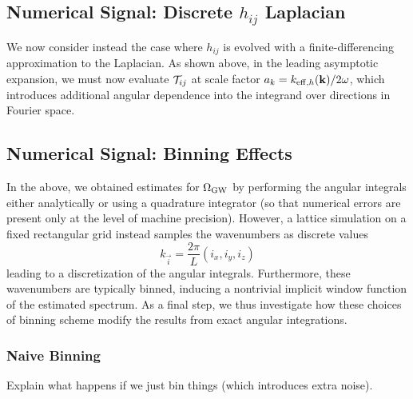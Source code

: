 \documentclass{revtex4}
\begin{document}

\subsection{Numerical Signal: Discrete $h_{ij}$ Laplacian}
We now consider instead the case where $h_{ij}$ is evolved with a finite-differencing approximation to the Laplacian.
As shown above, in the leading asymptotic expansion, we must now evaluate $\mathcal{T}_{ij}$ at scale factor $a_k = k_{{\rm eff},h}({\bf k})/2\omega$, which introduces additional angular dependence into the integrand over directions in Fourier space.

\subsection{Numerical Signal: Binning Effects}
In the above, we obtained estimates for $\Omega_{\rm GW}$ by performing the angular integrals either analytically or using a quadrature integrator (so that numerical errors are present only at the level of machine precision).
However, a lattice simulation on a fixed rectangular grid instead samples the wavenumbers as discrete values
\begin{equation}
  k_{\vec{i}} = \frac{2\pi}{L}\left(i_x,i_y,i_z\right)
\end{equation}
leading to a discretization of the angular integrals.
Furthermore, these wavenumbers are typically binned, inducing a nontrivial implicit window function of the estimated spectrum.
As a final step, we thus investigate how these choices of binning scheme modify the results from exact angular integrations.

\subsubsection{Naive Binning}
Explain what happens if we just bin things (which introduces extra noise).
\end{document}
